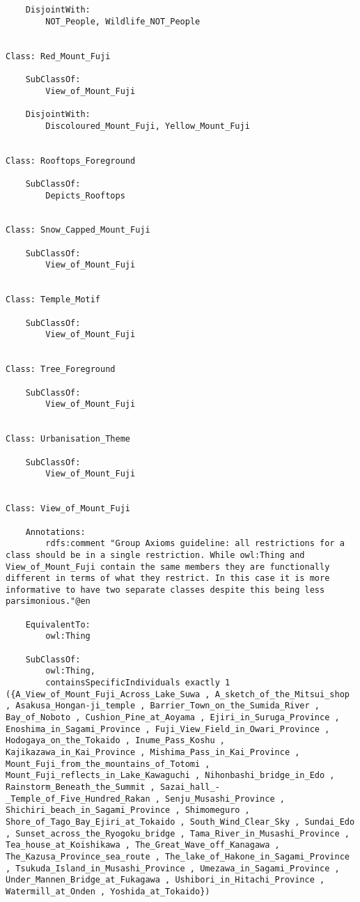 \documentclass[titlepage,a4paper,12pt,oneside]{book}
\begin{document}
\begin{appendices}
\begin{lstlisting}
    DisjointWith: 
        NOT_People, Wildlife_NOT_People
    
    
Class: Red_Mount_Fuji

    SubClassOf: 
        View_of_Mount_Fuji
    
    DisjointWith: 
        Discoloured_Mount_Fuji, Yellow_Mount_Fuji
    
    
Class: Rooftops_Foreground

    SubClassOf: 
        Depicts_Rooftops
    
    
Class: Snow_Capped_Mount_Fuji

    SubClassOf: 
        View_of_Mount_Fuji
    
    
Class: Temple_Motif

    SubClassOf: 
        View_of_Mount_Fuji
    
    
Class: Tree_Foreground

    SubClassOf: 
        View_of_Mount_Fuji
    
    
Class: Urbanisation_Theme

    SubClassOf: 
        View_of_Mount_Fuji
    
    
Class: View_of_Mount_Fuji

    Annotations: 
        rdfs:comment "Group Axioms guideline: all restrictions for a class should be in a single restriction. While owl:Thing and View_of_Mount_Fuji contain the same members they are functionally different in terms of what they restrict. In this case it is more informative to have two separate classes despite this being less parsimonious."@en
    
    EquivalentTo: 
        owl:Thing
    
    SubClassOf: 
        owl:Thing,
        containsSpecificIndividuals exactly 1 ({A_View_of_Mount_Fuji_Across_Lake_Suwa , A_sketch_of_the_Mitsui_shop , Asakusa_Hongan-ji_temple , Barrier_Town_on_the_Sumida_River , Bay_of_Noboto , Cushion_Pine_at_Aoyama , Ejiri_in_Suruga_Province , Enoshima_in_Sagami_Province , Fuji_View_Field_in_Owari_Province , Hodogaya_on_the_Tokaido , Inume_Pass_Koshu , Kajikazawa_in_Kai_Province , Mishima_Pass_in_Kai_Province , Mount_Fuji_from_the_mountains_of_Totomi , Mount_Fuji_reflects_in_Lake_Kawaguchi , Nihonbashi_bridge_in_Edo , Rainstorm_Beneath_the_Summit , Sazai_hall_-_Temple_of_Five_Hundred_Rakan , Senju_Musashi_Province , Shichiri_beach_in_Sagami_Province , Shimomeguro , Shore_of_Tago_Bay_Ejiri_at_Tokaido , South_Wind_Clear_Sky , Sundai_Edo , Sunset_across_the_Ryogoku_bridge , Tama_River_in_Musashi_Province , Tea_house_at_Koishikawa , The_Great_Wave_off_Kanagawa , The_Kazusa_Province_sea_route , The_lake_of_Hakone_in_Sagami_Province , Tsukuda_Island_in_Musashi_Province , Umezawa_in_Sagami_Province , Under_Mannen_Bridge_at_Fukagawa , Ushibori_in_Hitachi_Province , Watermill_at_Onden , Yoshida_at_Tokaido})
    

\end{lstlisting}
\end{appendices}
\end{document}
